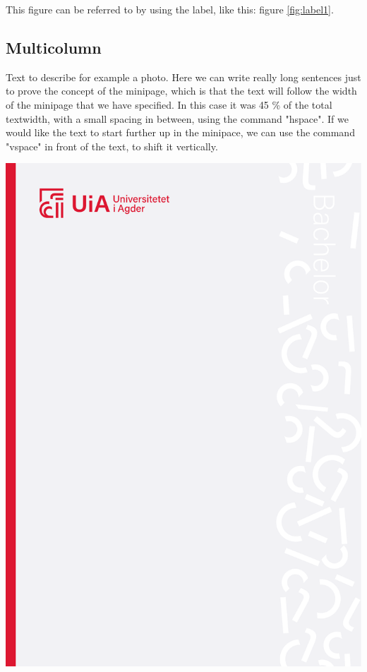 This figure can be referred to by using the label, like this: figure \ref{fig:label1}.


\subsection{Multicolumn}

\begin{minipage}{0.45\textwidth}

    \vspace{-4cm}
    Text to describe for example a photo. Here we can write really long sentences just to prove the concept of the minipage, which is that the text will follow the width of the minipage that we have specified. In this case it was 45 \% of the total textwidth, with a small spacing in between, using the command "hspace". If we would like the text to start further up in the minipace, we can use the command "vspace" in front of the text, to shift it vertically.

\end{minipage}
\hspace{0.05\textwidth}
\begin{minipage}{0.45\textwidth}
 
    \includegraphics[width = \textwidth]{Figures/Frontpage/forside_bachelor_nor.pdf}

\end{minipage}